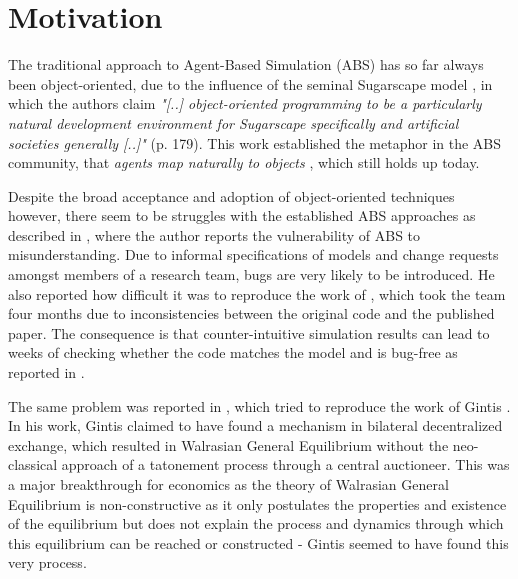 \chapter{Motivation}
\label{ch:motivation}
The traditional approach to Agent-Based Simulation (ABS) has so far always been object-oriented, due to the influence of the seminal Sugarscape model \cite{epstein_growing_1996}, in which the authors claim \textit{"[..] object-oriented programming to be a particularly natural development environment for Sugarscape specifically and artificial societies generally [..]"} (p. 179). This work established the metaphor in the ABS community, that \textit{agents map naturally to objects} \cite{north_managing_2007}, which still holds up today.

Despite the broad acceptance and adoption of object-oriented techniques however, there seem to be struggles with the established ABS approaches as described in \cite{axelrod_chapter_2006}, where the author reports the vulnerability of ABS to misunderstanding. Due to informal specifications of models and change requests amongst members of a research team, bugs are very likely to be introduced. He also reported how difficult it was to reproduce the work of \cite{axelrod_convergence_1995}, which took the team four months due to inconsistencies between the original code and the published paper. The consequence is that counter-intuitive simulation results can lead to weeks of checking whether the code matches the model and is bug-free as reported in \cite{axelrod_advancing_1997}.

The same problem was reported in \cite{ionescu_dependently-typed_2012}, which tried to reproduce the work of Gintis \cite{gintis_emergence_2006}. In his work, Gintis claimed to have found a mechanism in bilateral decentralized exchange, which resulted in Walrasian General Equilibrium without the neo-classical approach of a tatonement process through a central auctioneer. This was a major breakthrough for economics as the theory of Walrasian General Equilibrium is non-constructive as it only postulates the properties and existence of the equilibrium \cite{colell_microeconomic_1995} but does not explain the process and dynamics through which this equilibrium can be reached or constructed - Gintis seemed to have found this very process.

